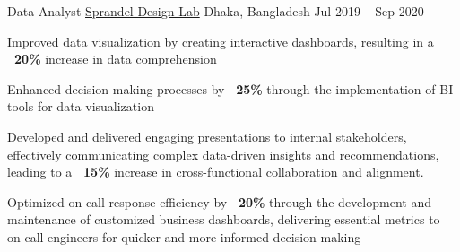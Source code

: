 \documentclass[]{awesome-cv}
\begin{document}
\vspace{-7mm}

\begin{cventries}
	\cventry
	{Data Analyst}
	{\href{}{Sprandel Design Lab}}
	{Dhaka, Bangladesh}
	{Jul 2019 – Sep 2020}
	{\begin{cvitems}
        \item Improved data visualization by creating interactive
dashboards, resulting in a \textbf{~{}20\%} increase in data comprehension
        \item Enhanced decision-making processes by \textbf{~{}25\%} through the implementation of BI tools for data visualization       
         \item Developed and delivered engaging presentations to internal stakeholders, effectively communicating complex data-driven insights and recommendations, leading to a \textbf{~{}15\%} increase in cross-functional collaboration and alignment.           
         \item Optimized on-call response efficiency by \textbf{~{}20\%} through the development and maintenance of customized business dashboards, delivering essential metrics to on-call engineers for quicker and more informed decision-making
	\end{cvitems}}
		
	
	
	
\end{cventries}
\end{document}

